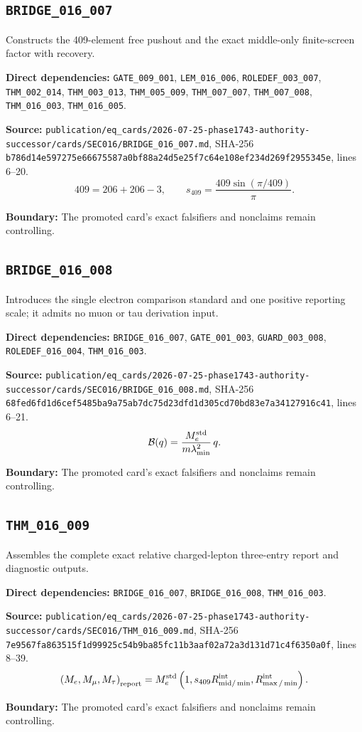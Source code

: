\subsection*{\texttt{BRIDGE_016_007}}
Constructs the 409-element free pushout and the exact middle-only finite-screen factor with recovery.
\par\noindent\textbf{Direct dependencies:} \texttt{GATE_009_001}, \texttt{LEM_016_006}, \texttt{ROLEDEF_003_007}, \texttt{THM_002_014}, \texttt{THM_003_013}, \texttt{THM_005_009}, \texttt{THM_007_007}, \texttt{THM_007_008}, \texttt{THM_016_003}, \texttt{THM_016_005}.
\par\noindent\textbf{Source:} \texttt{publication/eq_cards/2026-07-25-phase1743-authority-successor/cards/SEC016/BRIDGE_016_007.md}, SHA-256 \texttt{b786d14e597275e66675587a0bf88a24d5e25f7c64e108ef234d269f2955345e}, lines 6--20.
\[409=206+206-3,\qquad s_{409}=\frac{409\sin(\pi/409)}{\pi}.\]
\par\noindent\textbf{Boundary:} The promoted card's exact falsifiers and nonclaims remain controlling.
\subsection*{\texttt{BRIDGE_016_008}}
Introduces the single electron comparison standard and one positive reporting scale; it admits no muon or tau derivation input.
\par\noindent\textbf{Direct dependencies:} \texttt{BRIDGE_016_007}, \texttt{GATE_001_003}, \texttt{GUARD_003_008}, \texttt{ROLEDEF_016_004}, \texttt{THM_016_003}.
\par\noindent\textbf{Source:} \texttt{publication/eq_cards/2026-07-25-phase1743-authority-successor/cards/SEC016/BRIDGE_016_008.md}, SHA-256 \texttt{68fed6fd1d6cef5485ba9a75ab7dc75d23dfd1d305cd70bd83e7a34127916c41}, lines 6--21.
\[\mathcal B(q)=\frac{M_e^{\rm std}}{m\lambda_{\min}^2}\,q.\]
\par\noindent\textbf{Boundary:} The promoted card's exact falsifiers and nonclaims remain controlling.
\subsection*{\texttt{THM_016_009}}
Assembles the complete exact relative charged-lepton three-entry report and diagnostic outputs.
\par\noindent\textbf{Direct dependencies:} \texttt{BRIDGE_016_007}, \texttt{BRIDGE_016_008}, \texttt{THM_016_003}.
\par\noindent\textbf{Source:} \texttt{publication/eq_cards/2026-07-25-phase1743-authority-successor/cards/SEC016/THM_016_009.md}, SHA-256 \texttt{7e9567fa863515f1d99925c54b9ba85fc11b3aaf02a72a3d131d71c4f6350a0f}, lines 8--39.
\[\left(M_e,M_\mu,M_\tau\right)_{\rm report}=M_e^{\rm std}\left(1,s_{409}R_{\rm mid/\min}^{\rm int},R_{\max/\min}^{\rm int}\right).\]
\par\noindent\textbf{Boundary:} The promoted card's exact falsifiers and nonclaims remain controlling.
